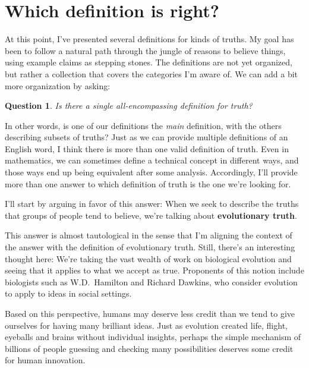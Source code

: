\documentclass[9pt, twoside]{book}
\newenvironment{answerwnum}[1]
  {\renewcommand\theinnercustomthm{#1}\innercustomthm}
  {\endinnercustomthm}
\newtheorem*{question*}{Question}
\theoremstyle{argtstyle}
\begin{document}
\section{Which definition is right?}

At this point, I've presented several definitions for kinds of
truths. My goal has been to follow a natural path
through the jungle of reasons to believe things, using
example claims as stepping stones.
The definitions are not yet organized, but rather a collection
that covers the categories I'm aware of.
We can add a bit more organization by asking:
\begin{question*}\label{q3}
    Is there a single all-encompassing definition for truth?
\end{question*}
In other words, is one of our definitions the {\em main} definition, with the
others describing subsets of truths?
Just as we can provide multiple definitions of an English word, I think there
is more than one valid definition of truth.
Even in mathematics, we can sometimes
define a technical concept in different ways, and those
ways end up being equivalent after some analysis.
Accordingly, I'll provide more than one answer to
which definition of truth is the one
we're looking for.

I'll start by arguing in favor of this answer:
\begin{answerwnum}{A}
    When we seek to describe the truths that groups of people tend to believe,
    we're talking about \textbf{evolutionary truth}.
\end{answerwnum}

This answer is almost tautological in the sense that I'm aligning the context of
the answer with the definition of evolutionary truth.
Still, there's
an interesting thought here: We're taking the vast wealth of work on
biological evolution and seeing that it applies to what we accept as true.
Proponents of this notion include
biologists such as W.D.~Hamilton and
Richard Dawkins, who consider evolution to apply to ideas in
social settings.

Based on this perspective, humans
may deserve less credit than we tend to give ourselves for having many
brilliant ideas. Just as evolution created life, flight, eyeballs and
brains without individual insights, perhaps the simple mechanism of billions of
people guessing and checking many possibilities deserves some
credit for human innovation.
\end{document}
